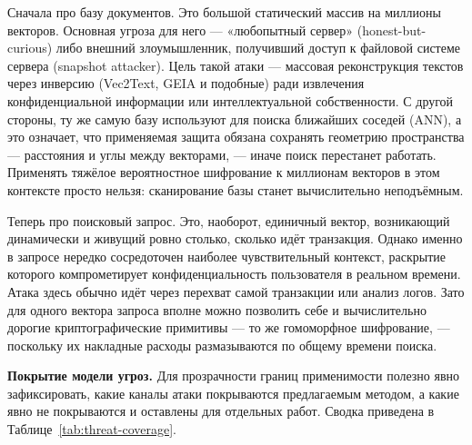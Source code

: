 \documentclass[a4paper, 12pt, oneside, openany]{article}
\begin{document}
Сначала про базу документов. Это большой статический массив на миллионы векторов. Основная угроза для него — «любопытный сервер» (honest-but-curious) либо внешний злоумышленник, получивший доступ к файловой системе сервера (snapshot attacker). Цель такой атаки — массовая реконструкция текстов через инверсию (Vec2Text, GEIA и подобные) ради извлечения конфиденциальной информации или интеллектуальной собственности. С другой стороны, ту же самую базу используют для поиска ближайших соседей (ANN), а это означает, что применяемая защита обязана сохранять геометрию пространства — расстояния и углы между векторами, — иначе поиск перестанет работать. Применять тяжёлое вероятностное шифрование к миллионам векторов в этом контексте просто нельзя: сканирование базы станет вычислительно неподъёмным.

Теперь про поисковый запрос. Это, наоборот, единичный вектор, возникающий динамически и живущий ровно столько, сколько идёт транзакция. Однако именно в запросе нередко сосредоточен наиболее чувствительный контекст, раскрытие которого компрометирует конфиденциальность пользователя в реальном времени. Атака здесь обычно идёт через перехват самой транзакции или анализ логов. Зато для одного вектора запроса вполне можно позволить себе и вычислительно дорогие криптографические примитивы — то же гомоморфное шифрование, — поскольку их накладные расходы размазываются по общему времени поиска.

\textbf{Покрытие модели угроз.} Для прозрачности границ применимости полезно явно зафиксировать, какие каналы атаки покрываются предлагаемым методом, а какие явно не покрываются и оставлены для отдельных работ. Сводка приведена в Таблице~\ref{tab:threat-coverage}.
\end{document}
